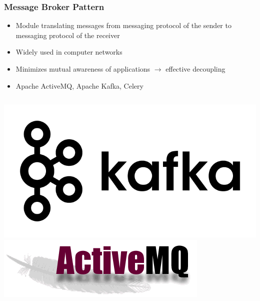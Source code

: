 \documentclass{beamer}
\begin{document}
\begin{frame}
\frametitle{Message Broker Pattern}
\begin{itemize}
\item Module translating messages from messaging protocol of the sender to messaging protocol of the receiver
\item Widely used in computer networks
\item Minimizes mutual awareness of applications $\rightarrow$ effective decoupling
\item Apache ActiveMQ, Apache Kafka, Celery
\end{itemize}
\begin{columns}
\includegraphics[scale=0.2]{kafka.png}
\includegraphics[scale=0.2]{ACTIVEMQ.png}
\end{columns}
\end{frame}
\end{document}
